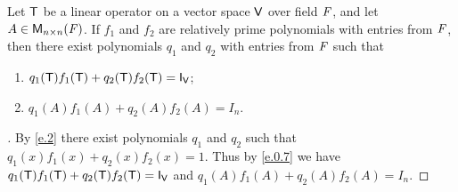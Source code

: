 \begin{thm}\label{e.5}
	Let \(\mathsf{T}\) be a linear operator on a vector space \(\mathsf{V}\) over field \(\mathit{F}\), and let \(A \in \ms[n][n][\F]\).
	If \(f_1\) and \(f_2\) are relatively prime polynomials with entries from \(\mathit{F}\), then there exist polynomials \(q_1\) and \(q_2\) with entries from \(\mathit{F}\) such that
	\begin{enumerate}
		\item \(q_1(\T) f_1(\T) + q_2(\T) f_2(\T) = \IT[\V]\);
		\item \(q_1(A) f_1(A) + q_2(A) f_2(A) = I_n\).
	\end{enumerate}
\end{thm}

\begin{proof}[]
	By \cref{e.2} there exist polynomials \(q_1\) and \(q_2\) such that \(q_1(x) f_1(x) + q_2(x) f_2(x) = 1\).
	Thus by \cref{e.0.7} we have \(q_1(\T) f_1(\T) + q_2(\T) f_2(\T) = \IT[\V]\) and \(q_1(A) f_1(A) + q_2(A) f_2(A) = I_n\).
\end{proof}
